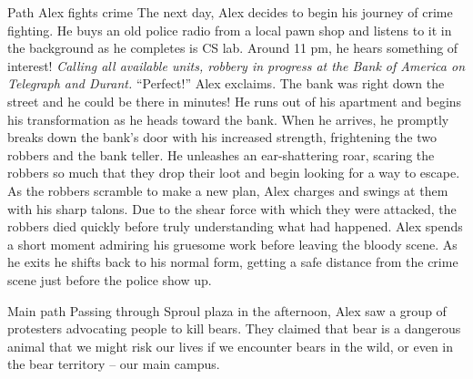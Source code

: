 \documentclass{article}
\begin{document}
Path Alex fights crime
The next day, Alex decides to begin his journey of crime fighting. He buys an old police radio from a local pawn shop and listens to it in the background as he completes is CS lab. Around 11 pm, he hears something of interest! \textit{Calling all available units, robbery in progress at the Bank of America on Telegraph and Durant.} “Perfect!” Alex exclaims. The bank was right down the street and he could be there in minutes! He runs out of his apartment and begins his transformation as he heads toward the bank. When he arrives, he promptly breaks down the bank’s door with his increased strength, frightening the two robbers and the bank teller. He unleashes an ear-shattering roar, scaring the robbers so much that they drop their loot and begin looking for a way to escape. As the robbers scramble to make a new plan, Alex charges and swings at them with his sharp talons. Due to the shear force with which they were attacked, the robbers died quickly before truly understanding what had happened. Alex spends a short moment admiring his gruesome work before leaving the bloody scene. As he exits he shifts back to his normal form, getting a safe distance from the crime scene just before the police show up. 





Main path
Passing through Sproul plaza in the afternoon, Alex saw a group of protesters advocating people to kill bears. They claimed that bear is a dangerous animal that we might risk our lives if we encounter bears in the wild, or even in the bear territory -- our main campus.
  
\end{document}
